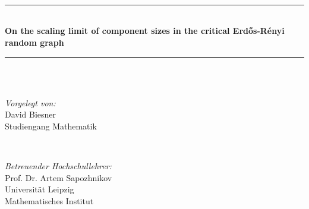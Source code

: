 \begin{titlepage}

\newcommand{\HRule}{\rule{\linewidth}{0.1mm}} %

\center %
 

\\[0.2cm] %
\\[0.2cm] %
\\[0.2cm] %


\HRule \\[0.4cm]
{ \huge \bfseries On the scaling limit of component sizes in the critical Erd\H os-Rényi random graph}\\[0.4cm] %
\HRule \\[1cm]

 

\\[2cm] %


\begin{minipage}{\textwidth}
\begin{flushleft} \large
\emph{Vorgelegt von:}\\
David Biesner \\
Studiengang Mathematik %
\end{flushleft}
\end{minipage}\\[1cm]

\begin{minipage}{\textwidth}
\begin{flushleft} \large
\emph{Betreuender Hochschullehrer:} \\
Prof. Dr. Artem Sapozhnikov \\
Universität Leipzig \\
Mathematisches Institut %
\end{flushleft}
\end{minipage}\\[6cm]


\end{titlepage}
